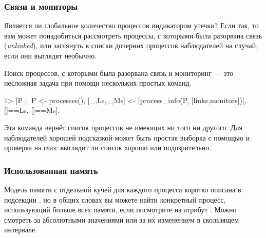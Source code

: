 \subsubsection{Связи и мониторы}

Является ли глобальное количество процессов индикатором утечки? Если так, то вам может понадобиться рассмотреть процессы, с которыми была разорвана связь (\emph{unlinked}), или заглянуть в списки дочерних процессов наблюдателей на случай, если они выглядят необычно.

Поиск процессов, с которыми была разорвана связь и мониторинг --- это несложная задача при помощи нескольких простых команд.

\begin{VerbatimEshell}
1> [P || P <- processes(),
         [{_,Ls},{_,Ms}] <- [process_info(P, [links,monitors])],
         []==Ls, []==Ms].
\end{VerbatimEshell}

Эта команда вернёт список процессов не имеющих ни того ни другого. Для наблюдателей хорошей подсказкой может быть простая выборка с помощью  и проверка на глаз: выглядит ли список хорошо или подозрительно.


\subsubsection{Использованная память}

Модель памяти с отдельной кучей для каждого процесса коротко описана в подсекции , но в общих словах вы можете найти конкретный процесс, использующий больше всех памяти, если посмотрите на атрибут . Можно смотреть за абсолютными значениями или за их изменением в скользящем интервале.

